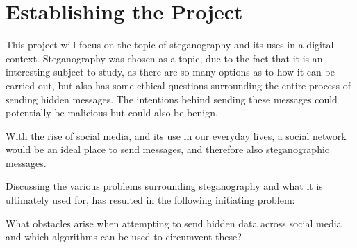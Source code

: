\section{Establishing the Project}
This project will focus on the topic of steganography and its uses in a digital context. 
Steganography was chosen as a topic, due to the fact that it is an interesting subject to study, as there are so many options as to how it can be carried out, but also has some ethical questions surrounding the entire process of sending hidden messages. 
The intentions behind sending these messages could potentially be malicious but could also be benign.

With the rise of social media, and its use in our everyday lives, a social network would be an ideal place to send messages, and therefore also steganographic messages.

Discussing the various problems surrounding steganography and what it is ultimately used for, has resulted in the following initiating problem:
\begin{tcolorbox}
What obstacles arise when attempting to send hidden data across social media and which algorithms can be used to circumvent these?
\end{tcolorbox}
